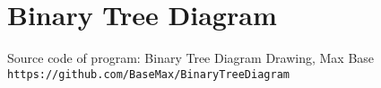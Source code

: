 \documentclass{article}
\begin{document}
\section{Binary Tree Diagram} 


\medskip

\begin{thebibliography}{9}

\bibitem{} 
Source code of program: Binary Tree Diagram Drawing, Max Base
\\\texttt{https://github.com/BaseMax/BinaryTreeDiagram}
\end{thebibliography}
\end{document}
